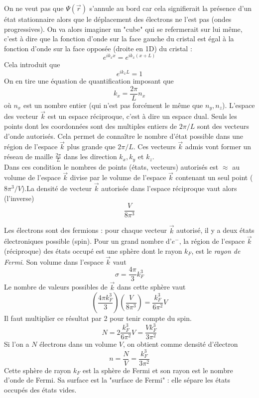 On ne veut pas que $\Psi(\vec{r})$ s'annule au bord car cela 
signifierait la présence d'un état stationnaire alors que le déplacement 
des électrons ne l'est pas (ondes progressives). On va alors imaginer 
un "cube" qui se refermerait sur lui même, c'est à dire que la fonction 
d'onde sur la face gauche du cristal est égal à la 
fonction d'onde sur la face opposée (droite en 1D) du cristal :
\begin{equation}
e^{ik_xx} = e^{ik_x(x+L)}
\end{equation}
Cela introduit que 
\begin{equation}
e^{ik_xL} = 1
\end{equation}
On en tire une équation de quantification imposant que
\begin{equation}
k_x = \frac{2\pi}{L}n_x
\end{equation}
où $n_x$ est un nombre entier (qui n'est pas forcément le même 
que $n_y, n_z$). L'espace des vecteur $\vec{k}$ est un espace 
réciproque, c'est à dire un espace dual. Seuls les points dont les 
coordonnées sont des multiples entiers de $2\pi/L$ sont des vecteurs 
d'onde autorisés. Cela permet de connaître le nombre d'état possible 
dans une région de l'espace $\vec{k}$ plus grande que $2\pi/L$. 
Ces vecteurs $\vec k$ admis vont former un réseau de maille
$\frac{2\pi}{L}$ dans les direction $k_x,k_y$ et $k_z$.\\

Dans ces condition le nombres de points (états, vecteurs) autorisés 
est $\approx$ au volume de l'espace $\vec{k}$ divise par le volume 
de l'espace $\vec{k}$ contenant un seul point ($8\pi^3/V$).La densité 
de vecteur $\vec{k}$ autorisée dans l'espace réciproque vaut alors 
(l'inverse) 
\begin{equation}
\frac{V}{8\pi^3}
\end{equation}

Les électrons sont des fermions : pour chaque vecteur $\vec k$ 
autorisé, il y a deux états électroniques possible (spin). Pour un 
grand nombre d'$e^-$, la région de l'espace $\vec{k}$ (réciproque) 
des états occupé est une sphère dont le rayon $k_F$, est le \textit{
rayon de Fermi}. Son volume dans l'espace $\vec{k}$ vaut
\begin{equation}
\sigma = \frac{4\pi}{3}k_F^3
\end{equation}
Le nombre de valeurs possibles de $\vec{k}$ dans cette sphère vaut 
\begin{equation}
\left(\frac{4\pi k_F^3}{3}\right)\left(\frac{V}{8\pi^3}\right) = 
\frac{k_F^3}{6\pi^2}V
\end{equation}
Il faut multiplier ce résultat par 2 pour tenir compte du spin.
\begin{equation}
N = 2\frac{k_F^3}{6\pi^2}V = \frac{Vk_F^3}{3\pi^2}
\end{equation}
Si l'on a $N$ électrons dans un volume $V$, on obtient comme 
densité d'électron
\begin{equation}
n = \frac{N}{V} = \frac{k_F^3}{3\pi^2}
\end{equation}
Cette sphère de rayon $k_F$ est la sphère de Fermi et son rayon est 
le nombre d'onde de Fermi. Sa surface est la "surface de Fermi" : 
elle sépare les états occupés des états vides.\\

